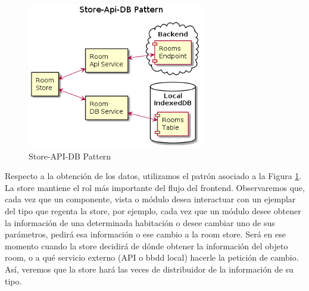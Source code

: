 \vspace{1cm}

\begin{figure}[hbt!]
\centering
\includegraphics[height=2.5in]{figures/diagrams/front/architecture/store-api-db-pattern.png}
\caption[store-api-db-pattern]{Store-API-DB Pattern\footnotemark}
\label{fig:front-store-api-db}
\end{figure}

Respecto a la obtención de los datos, utilizamos el patrón asociado a la Figura \ref{fig:front-store-api-db}. La store mantiene el rol más importante del flujo del frontend. Observaremos que, cada vez que un componente, vista o módulo desea interactuar con un ejemplar del tipo que regenta la store, por ejemplo, cada vez que un módulo desee obtener la información de una determinada habitación o desee cambiar uno de sus parámetros, pedirá esa información o ese cambio a la room store. Será en ese momento cuando la store decidirá de dónde obtener la información del objeto room, o a qué servicio externo (API o \gls{bbdd} local) hacerle la petición de cambio. Así, veremos que la store hará las veces de distribuidor de la información de su tipo.

\vspace{0.5cm}

